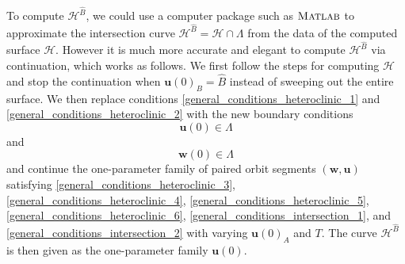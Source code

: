 \documentclass{ws-ijbc}
\begin{document}
To compute $\mathscr{H}^{\widehat{B}}$, we could use a computer package such as $\textsc{Matlab}$ to approximate the intersection curve $\mathscr{H}^{\widehat{B}} = \mathscr{H} \cap \Lambda$ from the data of the computed surface $\mathscr{H}$.  However it is much more accurate and elegant to compute $\mathscr{H}^{\widehat{B}}$ via continuation, which works as follows.  We first follow the steps for computing $\mathscr{H}$ and stop the continuation when $\mathbf{u}(0)_B = \widehat{B}$ instead of sweeping out the entire surface.  We then replace conditions \eqref{general_conditions_heteroclinic_1} and \eqref{general_conditions_heteroclinic_2} with the new boundary conditions
%
\begin{equation}
	\mathbf{u}(0) \in \Lambda
	\label{general_conditions_intersection_1}
\end{equation}
%
and
%
\begin{equation}
	\mathbf{w}(0) \in \Lambda
	\label{general_conditions_intersection_2}
\end{equation}	
%
and continue the one-parameter family of paired orbit segments $(\mathbf{w},\mathbf{u})$ satisfying \eqref{general_conditions_heteroclinic_3}, \eqref{general_conditions_heteroclinic_4}, \eqref{general_conditions_heteroclinic_5}, \eqref{general_conditions_heteroclinic_6}, \eqref{general_conditions_intersection_1}, and \eqref{general_conditions_intersection_2} with varying $\mathbf{u}(0)_A$ and $T$.  The curve $\mathscr{H}^{\widehat{B}}$ is then given as the one-parameter family $\mathbf{u}(0)$.
\end{document}
